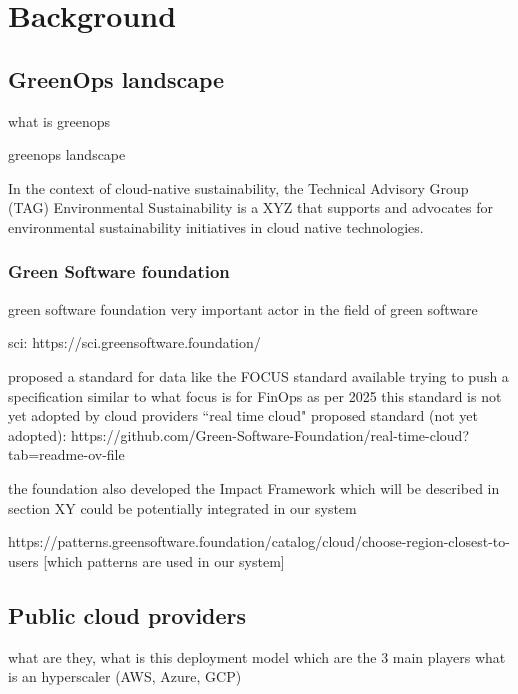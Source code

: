 \chapter{Background}
\label{cha:background}

\section{GreenOps landscape}

what is greenops

greenops landscape 

In the context of cloud-native sustainability,
the Technical Advisory Group (TAG) Environmental Sustainability is a XYZ that supports and advocates for environmental sustainability initiatives in cloud native technologies.



\subsection{Green Software foundation}

green software foundation
very important actor in the field of green software

sci: https://sci.greensoftware.foundation/

proposed a standard for data like the FOCUS standard available 
trying to push a specification similar to what focus is for FinOps
as per 2025 this standard is not yet adopted by cloud providers
``real time cloud" proposed standard (not yet adopted): https://github.com/Green-Software-Foundation/real-time-cloud?tab=readme-ov-file

the foundation also developed the Impact Framework which will be described in section XY
could be potentially integrated in our system

https://patterns.greensoftware.foundation/catalog/cloud/choose-region-closest-to-users
[which patterns are used in our system]

\section{Public cloud providers}

what are they, what is this deployment model
which are the 3 main players
what is an hyperscaler (AWS, Azure, GCP)

